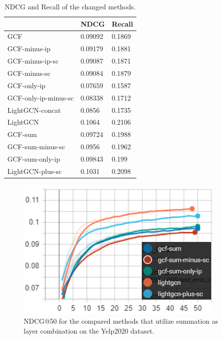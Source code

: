 \begin{table}[]
    \centering
    \begin{tabular}{|l|l|l|}
        \hline
                             & NDCG    & Recall \\ \hline
        GCF                  & 0.09092 & 0.1869 \\ \hline
        GCF-minus-ip         & 0.09179 & 0.1881 \\ \hline
        GCF-minus-ip-sc      & 0.09087 & 0.1871 \\ \hline
        GCF-minus-sc         & 0.09084 & 0.1879 \\ \hline
        GCF-only-ip          & 0.07659 & 0.1587 \\ \hline
        GCF-only-ip-minus-sc & 0.08338 & 0.1712 \\ \hline
        LightGCN-concat      & 0.0856  & 0.1735 \\ \hline
        LightGCN             & 0.1064  & 0.2106 \\ \hline
        GCF-sum              & 0.09724 & 0.1988 \\ \hline
        GCF-sum-minus-sc     & 0.0956  & 0.1962 \\ \hline
        GCF-sum-only-ip      & 0.09843 & 0.199  \\ \hline
        LightGCN-plus-sc     & 0.1031  & 0.2098 \\ \hline
    \end{tabular}
    \caption{NDCG and Recall of the changed methods.}
    \label{tab:ablation-results}
\end{table}
\begin{figure}[h!]
    \includegraphics[width=\linewidth]{figures/gcf-sum-ndcg.png}
    \caption{NDCG@50 for the compared methods that utilize summation as layer combination on the Yelp2020 dataset.}
    \label{fig:GCF-sum-NDCG-ablation-study}
\end{figure}
